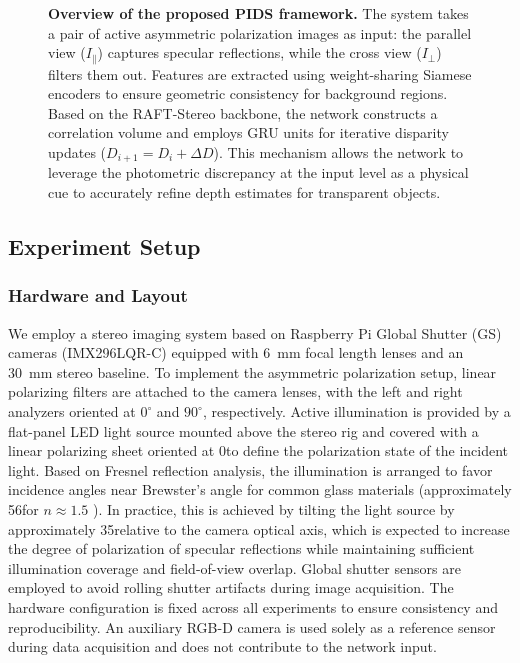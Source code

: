 \documentclass[letterpaper, 10 pt, conference]{ieeeconf}  %
\begin{document}
\begin{figure}[t!]
{%
}%
\caption{\textbf{Overview of the proposed PIDS framework.} The system takes a pair of active asymmetric polarization images as input: the parallel view ($I_{\parallel}$) captures specular reflections, while the cross view ($I_{\perp}$) filters them out. Features are extracted using weight-sharing Siamese encoders to ensure geometric consistency for background regions. Based on the RAFT-Stereo backbone, the network constructs a correlation volume and employs GRU units for iterative disparity updates ($D_{i+1} = D_i + \Delta D$). This mechanism allows the network to leverage the photometric discrepancy at the input level as a physical cue to accurately refine depth estimates for transparent objects.}
\label{fig:system_overview}
\end{figure}
\subsection{\textbf{Experiment Setup}}
\subsubsection{\textbf{Hardware and Layout}}
We employ a stereo imaging system based on Raspberry Pi Global Shutter (GS) cameras (IMX296LQR-C) equipped with \SI{6}{mm} focal length lenses and an \SI{30}{mm} stereo baseline.
To implement the asymmetric polarization setup, linear polarizing filters are attached to the camera lenses, with the left and right analyzers oriented at $0^{\circ}$ and $90^{\circ}$, respectively.
Active illumination is provided by a flat-panel LED light source mounted above the stereo rig and covered with a linear polarizing sheet oriented at 0\textdegree to define the polarization state of the incident light.
Based on Fresnel reflection analysis, the illumination is arranged to favor incidence angles near Brewster’s angle for common glass materials (approximately 56\textdegree for $n \approx1.5$ ).
In practice, this is achieved by tilting the light source by approximately 35\textdegree relative to the camera optical axis, which is expected to increase the degree of polarization of specular reflections while maintaining sufficient illumination coverage and field-of-view overlap.
Global shutter sensors are employed to avoid rolling shutter artifacts during image acquisition.
The hardware configuration is fixed across all experiments to ensure consistency and reproducibility.
An auxiliary RGB-D camera is used solely as a reference sensor during data acquisition and does not contribute to the network input.
\end{document}
